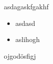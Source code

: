 \documentclass{include/thesis}
\begin{document}
	
	\FrontMatter
	
	

	\TableOfContents

	\MainMatter

	asdagaskfgakhf
	\begin{itemize}
		\item asdasd
		\item aslihogh
	\end{itemize}
	
	ojgodösfigj	
\end{document}
